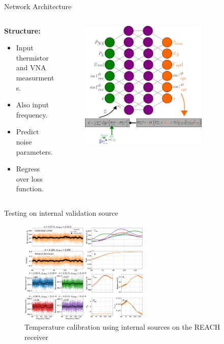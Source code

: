 \documentclass[aspectratio=169]{beamer}
\begin{document}
\begin{frame}{\small{Network Architecture}}
	\begin{columns}
		\begin{column}{0.35\textwidth}
			\textbf{Structure:}
			\begin{itemize}
				\item Input thermistor and VNA measurments.
				\item Also input frequency.
				\item Predict noise parameters.
				\item Regress over loss function.
			\end{itemize}
		\end{column}

		\begin{column}{0.65\textwidth}
			\begin{figure}
				\centering
				\includegraphics[width=0.75\textwidth]{images/nn.png}
			\end{figure}
		\end{column}
	\end{columns}
	\vfill
\end{frame}


\begin{frame}{\small{Testing on internal validation source}}
	\begin{figure}
		\centering
		\includegraphics[width=0.55\textwidth]{images/temps.pdf}
		\caption{Temperature calibration using internal sources on the REACH receiver}
	\end{figure}
\end{frame}
\end{document}
